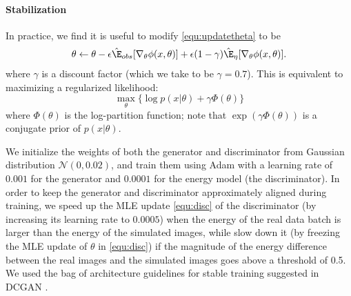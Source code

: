 \documentclass{article} \usepackage{iclr2017_conference,times}
\begin{document}
\paragraph{Stabilization}
In practice, we find it is useful to modify \eqref{equ:updatetheta} to be 
\begin{align}\label{equ:disc}
\theta \gets \theta - \epsilon \hat\E_{obs}[ \nabla_\theta \phi (x,\theta) ] + 
\epsilon (1-\gamma) \hat\E_{\eta} [\nabla_\theta \phi(x, \theta)]. 
\end{align}
where $\gamma$ is a discount factor (which we take to be $\gamma = 0.7$). 
This is equivalent to maximizing a regularized likelihood: 
$$
\max_\theta  \{ \log   p(x |\theta)  +  \gamma \Phi(\theta)\}
$$
where $\Phi(\theta)$ is the log-partition function; note that $\exp( \gamma \Phi(\theta))$ is a conjugate prior of $p(x|\theta)$. 

We initialize the weights of both the generator and discriminator from Gaussian distribution $\mathcal{N}(0,0.02)$, 
and train them using Adam \citep{kingma2014adam} with a learning rate of $0.001$ for the generator and $0.0001$ for the energy model (the discriminator).  
In order to keep the generator and discriminator approximately aligned during training, 
we speed up the MLE update \eqref{equ:disc} of the discriminator (by increasing its learning rate to $0.0005$) when the energy of the real data batch is larger than the energy of the simulated images, 
while slow down it (by freezing the MLE update of $\theta$ in \eqref{equ:disc}) if the magnitude of the energy difference between the real images and the simulated images goes above a threshold of 0.5.
We used the bag of architecture guidelines for stable training suggested in DCGAN \citep{radford2015unsupervised}.

\begin{comment}
We tested our SteinGAN on four datasets,  
MNIST \footnote{\url{http://yann.lecun.com/exdb/mnist/}}, CIFAR-10 \footnote{\url{https://www.cs.toronto.edu/~kriz/cifar.html}}, CelebA \footnote{\url{http://mmlab.ie.cuhk.edu.hk/projects/CelebA.html}}, and Large-scale Scene Understanding (LSUN) \footnote{\url{http://lsun.cs.princeton.edu/2016/}}, on which we find our method tends to generate realistic-looking images competitive with DCGAN \citep{radford2015unsupervised} (see Figure~\ref{fig:face}-Figure~\ref{fig:cifar10}). 
In particular, we find we generate better images than DCGAN on CelebA (Figure~\ref{fig:face}), 
and our simulated CIFAR-10 images achieves better testing classification accuracy when used as a training data (see Figure~\ref{fig:cifar10}). 
See Appendix~\ref{sec:gan} for more information. 
We will provide code to reproduce our experiments.  
\end{comment}
\end{document}
